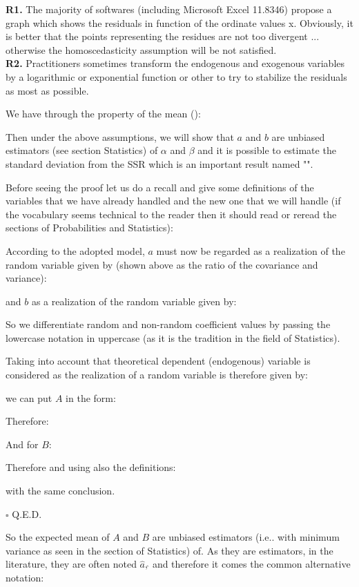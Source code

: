 	\begin{tcolorbox}[title=Remarks,colframe=black,arc=10pt]
\textbf{R1. }The majority of softwares (including Microsoft Excel 11.8346) propose a graph which shows the residuals in function of the ordinate values x. Obviously, it is better that the points representing the residues are not too divergent ... otherwise the homoscedasticity assumption will be not satisfied.\\

\textbf{R2.} Practitioners sometimes transform the endogenous and exogenous variables by a logarithmic or exponential function or other to try to stabilize the residuals as most as possible.
	\end{tcolorbox}	
	
	\begin{theorem}
	We have through the property of the mean ():
	
	\end{theorem}
	Then under the above assumptions, we will show that $a$ and $b$ are unbiased estimators (see section Statistics) of $\alpha$ and $\beta$ and it is possible to estimate the standard deviation from the SSR which is an important result named "".
	
	Before seeing the proof let us do a recall and give some definitions of the variables that we have already handled and the new one that we will handle (if the vocabulary seems technical to the reader then it should read or reread the sections of Probabilities and Statistics):
	
	
	
	\begin{dem}
	According to the adopted model, $a$ must now be regarded as a realization of the random variable given by (shown above as the ratio of the covariance and variance):
	
	and $b$ as a realization of the random variable given by:
	
	So we differentiate random and non-random coefficient values by passing the lowercase notation in uppercase (as it is the tradition in the field of Statistics).
	
	Taking into account that theoretical dependent (endogenous) variable is considered as the realization of a random variable is therefore given by:
	
	we can put $A$ in the form:
	
	Therefore:
	
	
	And for $B$:
	
	Therefore and using also the definitions:
	
	with the same conclusion.
	\begin{flushright}
		$\square$  Q.E.D.
	\end{flushright}
	\end{dem}
	So the expected mean of $A$ and $B$ are unbiased estimators (i.e.. with minimum variance as seen in the section of Statistics) of. As they are estimators, in the literature, they are often noted $\hat{a},\hat{}$ and therefore it comes the common alternative notation:
		
